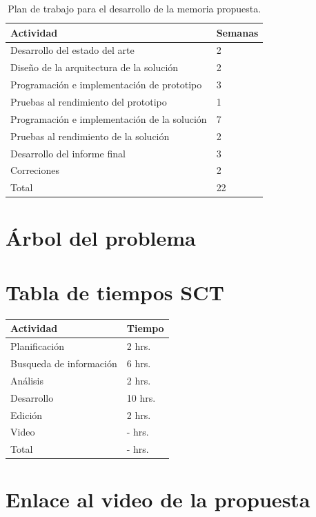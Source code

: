 \documentclass[conference,compsoc]{IEEEtran}
\begin{document}
\begin{table}[h]
    \centering
    \caption{Plan de trabajo para el desarrollo de la memoria propuesta.}
    \label{tab:plan-trabajo}
    \begin{tabular}{|l|l|}
        \hline
        Actividad                                    & Semanas \\ \hline
        Desarrollo del estado del arte               & 2       \\ \hline
        Diseño de la arquitectura de la solución     & 2       \\ \hline
        Programación e implementación de prototipo   & 3       \\ \hline
        Pruebas al rendimiento del prototipo         & 1       \\ \hline
        Programación e implementación de la solución & 7       \\ \hline
        Pruebas al rendimiento de la solución        & 2       \\ \hline
        Desarrollo del informe final                 & 3       \\ \hline
        Correciones                                  & 2       \\ \hline
        Total                                        & 22      \\ \hline
    \end{tabular}
\end{table}





\newpage

\appendices

\section{Árbol del problema}

\section{Tabla de tiempos SCT}

\begin{table}[h]
    \begin{tabular}{|l|l|}
        \hline
        Actividad                   & Tiempo    \\ \hline
        Planificación               & 2  hrs.    \\ \hline
        Busqueda de información     & 6  hrs.    \\ \hline
        Análisis                    & 2  hrs.    \\ \hline
        Desarrollo                  & 10 hrs.    \\ \hline
        Edición                     & 2  hrs.    \\ \hline
        Video                       & -  hrs.    \\ \hline
        Total                       & -  hrs.    \\ \hline
    \end{tabular}
\end{table}

\section{Enlace al video de la propuesta}
\end{document}
